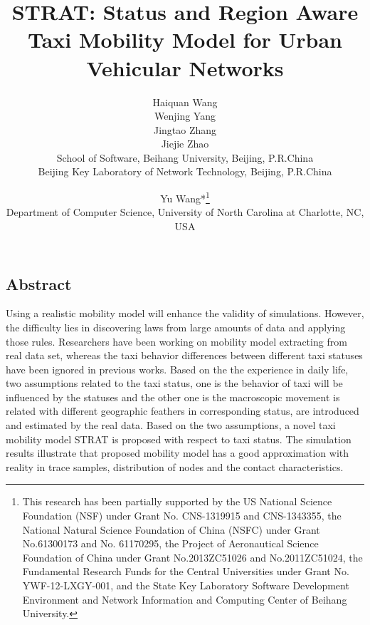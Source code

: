\documentclass[camera-ready,twocolumn,10pt]{IEEEtran}
\begin{document}

\title{\Large \bf STRAT: Status and Region Aware Taxi Mobility Model for Urban Vehicular Networks}

\author{
{\rm Haiquan Wang}\\
{\rm Wenjing Yang}\\
{\rm Jingtao Zhang}\\
{\rm Jiejie Zhao}\\
School of Software, Beihang University, Beijing, P.R.China\\
Beijing Key Laboratory of Network Technology, Beijing, P.R.China\\
\and
{\rm Yu Wang*\thanks{
 This research has been partially supported by the US National Science Foundation (NSF) under Grant No. CNS-1319915 and CNS-1343355, the National Natural Science Foundation of China (NSFC) under Grant No.61300173 and No. 61170295, the Project of Aeronautical Science Foundation of China under Grant No.2013ZC51026 and No.2011ZC51024, the Fundamental Research Funds for the Central Universities under Grant No. YWF-12-LXGY-001, and the State Key Laboratory Software Development Environment and Network Information and Computing Center of Beihang University.}}\\
Department of Computer Science, University of North Carolina at Charlotte, NC, USA\\
}
\maketitle


\subsection*{Abstract}
Using a realistic mobility model will enhance the validity of simulations. However, the difficulty lies in discovering laws from large amounts of data and applying those rules. Researchers have been working on mobility model extracting from real data set, whereas the taxi behavior differences between different taxi statuses have been ignored in previous works.
Based on the the experience in daily life, two assumptions related to the taxi status, one is the behavior of taxi will be influenced by the statuses and the other one is the macroscopic movement is related with different geographic feathers in corresponding status, are introduced and estimated by the real data. Based on the two assumptions, a novel taxi mobility model STRAT is proposed with respect to taxi status. The simulation results illustrate that proposed mobility model has a good approximation with reality in trace samples, distribution of nodes and the contact characteristics.
\end{document}
